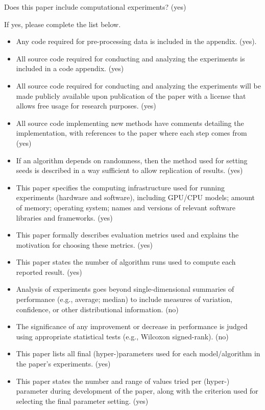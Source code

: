 \documentclass[letterpaper]{article} %
\begin{document}
Does this paper include computational experiments? (yes)

If yes, please complete the list below.

\begin{itemize}
    \item Any code required for pre-processing data is included in the appendix. (yes).
    \item All source code required for conducting and analyzing the experiments is included in a code appendix. (yes)
    \item All source code required for conducting and analyzing the experiments will be made publicly available upon publication of the paper with a license that allows free usage for research purposes. (yes)
    \item All source code implementing new methods have comments detailing the implementation, with references to the paper where each step comes from (yes)
    \item If an algorithm depends on randomness, then the method used for setting seeds is described in a way sufficient to allow replication of results. (yes)
    \item This paper specifies the computing infrastructure used for running experiments (hardware and software), including GPU/CPU models; amount of memory; operating system; names and versions of relevant software libraries and frameworks. (yes)
    \item This paper formally describes evaluation metrics used and explains the motivation for choosing these metrics. (yes)
    \item This paper states the number of algorithm runs used to compute each reported result. (yes)
    \item Analysis of experiments goes beyond single-dimensional summaries of performance (e.g., average; median) to include measures of variation, confidence, or other distributional information. (no)
    \item The significance of any improvement or decrease in performance is judged using appropriate statistical tests (e.g., Wilcoxon signed-rank). (no)
    \item This paper lists all final (hyper-)parameters used for each model/algorithm in the paper’s experiments. (yes)
    \item This paper states the number and range of values tried per (hyper-) parameter during development of the paper, along with the criterion used for selecting the final parameter setting. (yes)
\end{itemize}
\end{document}
